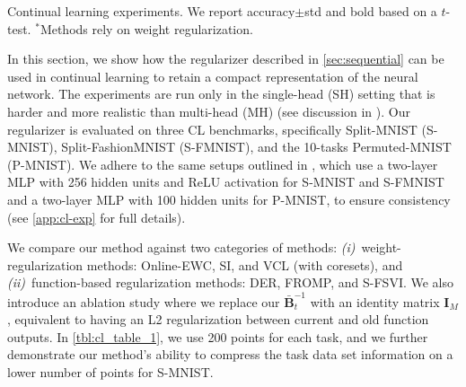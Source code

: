\documentclass{article} %
\newlength{\tblw}
\newcommand{\mbf}[1]{\mathbf{#1}}
\newcommand{\MB}{\mbf{B}}
\newcommand{\MI}{\mbf{I}}
\begin{document}
\setlength{\columnsep}{8pt}
\setlength{\intextsep}{0pt}
\begin{wraptable}{R}{.65\textwidth}
  \centering\scriptsize
  \caption{Continual learning experiments. We report accuracy${\pm}$std and bold based on a $t$-test. $^*$Methods rely on weight regularization.}
	\label{tbl:cl_table_1}

	\renewcommand{\arraystretch}{1.}
	\setlength{\tabcolsep}{1pt}
	\setlength{\tblw}{0.14\textwidth}

	\newcommand{\val}[2]{%
		$#1$\textcolor{gray}{\tiny ${\pm}#2$}
	}

	\vspace*{-4pt}

	
\end{wraptable}
%
In this section, we show how the regularizer described in \cref{sec:sequential} can be used in continual learning to retain a compact representation of the neural network.
The experiments are run only in the single-head (SH) setting that is harder and more realistic than multi-head (MH) (see discussion in \citep{van2019three}).
 Our regularizer is evaluated on three CL benchmarks, specifically Split-MNIST (S-MNIST), Split-FashionMNIST (S-FMNIST), and the 10-tasks Permuted-MNIST (P-MNIST). We adhere to the same setups outlined in \cite{rudner2022continual, pan2020continual}, which use a two-layer MLP with 256 hidden units and ReLU activation for S-MNIST and S-FMNIST and a two-layer MLP with 100 hidden units for P-MNIST, to ensure consistency (see \cref{app:cl-exp} for full details).

We compare our method against two categories of methods: {\em (i)}~weight-regularization methods: Online-EWC, SI, and VCL (with coresets), and {\em(ii)}~function-based regularization methods: DER, FROMP, and S-FSVI. We also introduce an ablation study where we replace our $\bar{\MB}_t^{-1}$ with an identity matrix $\MI_M$, equivalent to having an L2 regularization between current and old function outputs.
In \cref{tbl:cl_table_1}, we use 200 points for each task, and we further demonstrate our method's ability to compress the task data set information on a lower number of points for S-MNIST.
\end{document}
